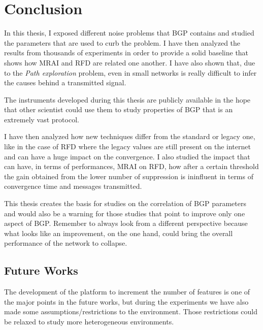 \chapter{Conclusion}
\label{cha:conclusion}

In this thesis, I exposed different noise problems that \ac{BGP} contains and
studied the parameters that are used to curb the problem.
I have then analyzed the results from thousands of experiments in order to
provide a solid baseline that shows how \ac{MRAI} and \ac{RFD} are related
one another.
I have also shown that, due to the \textit{Path exploration} problem, even
in small networks is really difficult to infer the causes behind a transmitted
signal.

The instruments developed during this thesis are publicly available in the
hope that other scientist could use them to study properties of \ac{BGP} that
is an extremely vast protocol.

I have then analyzed how new techniques differ from the standard or legacy one,
like in the case of \ac{RFD} where the legacy values are still present on the
internet and can have a huge impact on the convergence.
I also studied the impact that can have, in terms of performances, \ac{MRAI} on \ac{RFD},
how after a certain threshold the gain obtained from the lower number of
suppression is ininfluent in terms of convergence time and messages transmitted.

This thesis creates the basis for studies on the correlation of \ac{BGP} parameters
and would also be a warning for those studies that point to improve only
one aspect of \ac{BGP}.
Remember to always look from a different perspective because what looks like an
improvement, on the one hand, could bring the overall performance of the
network to collapse.


\section{Future Works}
\label{sec:future_works}

The development of the platform to increment the number of features is one of
the major points in the future works, but during the experiments we have also
made some assumptions/restrictions to the environment.
Those restrictions could be relaxed to study more heterogeneous environments.

